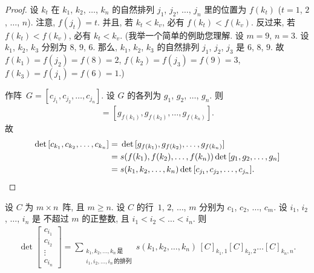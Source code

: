 \documentclass[%
    UTF8,%
    fontset=none,%
    punct=kaiming,%
    zihao=-4,%
    a4paper,%
    oneside,%
]{ctexbook}
\renewcommand*{\geq}{\geqslant}
\begin{document}
\begin{proof}
    设 \(k_t\) 在 \(k_1\), \(k_2\), \(\dots\), \(k_n\)
    的自然排列
    \(j_1\), \(j_2\), \(\dots\), \(j_n\)
    里的位置为 \(f(k_t)\)
    (\(t = 1\), \(2\), \(\dots\), \(n\)).
    注意, \(f(j_t) = t\).
    并且, 若 \(k_t < k_v\), 必有 \(f(k_t) < f(k_v)\).
    反过来, 若 \(f(k_t) < f(k_v)\), 必有 \(k_t < k_v\).
    (我举一个简单的例助您理解.
    设 \(m = 9\), \(n = 3\).
    设 \(k_1\), \(k_2\), \(k_3\) 分别为 \(8\), \(9\), \(6\).
    那么, \(k_1\), \(k_2\), \(k_3\) 的自然排列
    \(j_1\), \(j_2\), \(j_3\)
    是
    \(6\), \(8\), \(9\).
    故 \(f(k_1) = f(j_2) = f(8) = 2\),
    \(f(k_2) = f(j_3) = f(9) = 3\),
    \(f(k_3) = f(j_1) = f(6) = 1\).)

    作阵~\(G = [c_{j_1}, c_{j_2}, \dots, c_{j_n}]\).
    设 \(G\) 的各列为 \(g_1\), \(g_2\), \(\dots\), \(g_n\).
    则
    \begin{align*}
        [c_{k_1}, c_{k_2}, \dots, c_{k_n}]
        = [g_{f(k_1)}, g_{f(k_2)}, \dots, g_{f(k_n)}].
    \end{align*}
    故
    \begin{align*}
        \det {[c_{k_1}, c_{k_2}, \dots, c_{k_n}]}
        = {} &
        \det {[g_{f(k_1)}, g_{f(k_2)}, \dots, g_{f(k_n)}]}
        \\
        = {} &
        s(f(k_1), f(k_2), \dots, f(k_n))
        \det {[g_1, g_2, \dots, g_n]}
        \\
        = {} &
        s(k_1, k_2, \dots, k_n)
        \det {[c_{j_1}, c_{j_2}, \dots, c_{j_n}]}.
        \qedhere
    \end{align*}
\end{proof}

\begin{theorem}
    设 \(C\) 为 \(m \times n\)~阵,
    且 \(m \geq n\).
    设 \(C\) 的行~\(1\), \(2\), \(\dots\), \(m\)
    分别为 \(c_1\), \(c_2\), \(\dots\), \(c_m\).
    设 \(i_1\), \(i_2\), \(\dots\), \(i_n\) 是%
    不超过 \(m\) 的正整数,
    且 \(i_1 < i_2 < \dots < i_n\).
    则
    \begin{align*}
        \det {
            \begin{bmatrix}
                c_{i_1} \\
                c_{i_2} \\
                \vdots  \\
                c_{i_n}
            \end{bmatrix}
        }
        =
        \sum_{\substack{
        k_1, k_2, \dots, k_n\,\text{是} \\
                i_1, i_2, \dots, i_n\,\text{的排列}
            }}
        {s(k_1, k_2, \dots, k_n)\,
            [C]_{k_1,1} [C]_{k_2,2} \dots [C]_{k_n,n}}.
    \end{align*}
\end{theorem}
\end{document}
